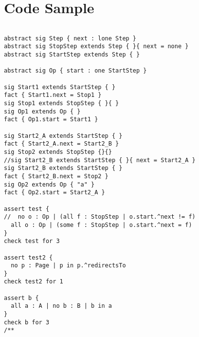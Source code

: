 \chapter{Code Sample}

\begin{verbatim}

abstract sig Step { next : lone Step }
abstract sig StopStep extends Step { }{ next = none }
abstract sig StartStep extends Step { }

abstract sig Op { start : one StartStep }

sig Start1 extends StartStep { }
fact { Start1.next = Stop1 }
sig Stop1 extends StopStep { }{ }
sig Op1 extends Op { }
fact { Op1.start = Start1 }

sig Start2_A extends StartStep { }
fact { Start2_A.next = Start2_B }
sig Stop2 extends StopStep {}{}
//sig Start2_B extends StartStep { }{ next = Start2_A }
sig Start2_B extends StartStep { }
fact { Start2_B.next = Stop2 }
sig Op2 extends Op { "a" }
fact { Op2.start = Start2_A }

assert test {
//  no o : Op | (all f : StopStep | o.start.^next != f)
  all o : Op | (some f : StopStep | o.start.^next = f)
}
check test for 3

assert test2 {
  no p : Page | p in p.^redirectsTo
}
check test2 for 1

assert b {
  all a : A | no b : B | b in a
}
check b for 3
/**\end{verbatim}
